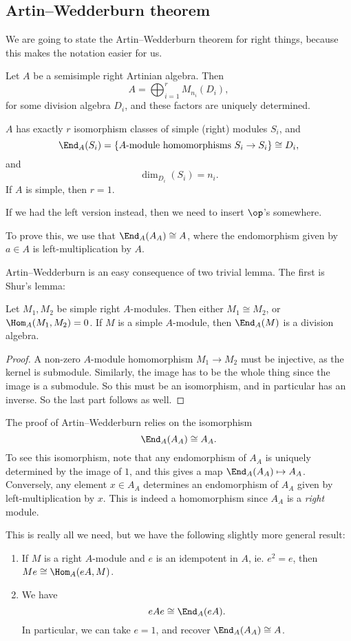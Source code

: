 \documentclass[a4paper]{article}
\begin{document}
\subsection{Artin--Wedderburn theorem}
We are going to state the Artin--Wedderburn theorem for right things, because this makes the notation easier for us.
\begin{thm}
  Let $A$ be a semisimple right Artinian algebra. Then
  \[
    A = \bigoplus_{i = 1}^r M_{n_i}(D_i),
  \]
  for some division algebra $D_i$, and these factors are uniquely determined.
  
  $A$ has exactly $r$ isomorphism classes of simple (right) modules $S_i$, and
  \[
    \End_A (S_i) = \{\text{$A$-module homomorphisms $S_i \to S_i$}\} \cong D_i,
  \]
  and
  \[
    \dim_{D_i}(S_i) = n_i.
  \]
  If $A$ is simple, then $r = 1$.
\end{thm}
If we had the left version instead, then we need to insert $\op$'s somewhere.

To prove this, we use that $\End_A(A_A) \cong A$, where the endomorphism given by $a \in A$ is left-multiplication by $A$.

Artin--Wedderburn is an easy consequence of two trivial lemma. The first is Shur's lemma:
\begin{lemma}
  Let $M_1, M_2$ be simple right $A$-modules. Then either $M_1 \cong M_2$, or $\Hom_A(M_1, M_2) = 0$. If $M$ is a simple $A$-module, then $\End_A(M)$ is a division algebra.
\end{lemma}

\begin{proof}
  A non-zero $A$-module homomorphism $M_1 \to M_2$ must be injective, as the kernel is submodule. Similarly, the image has to be the whole thing since the image is a submodule. So this must be an isomorphism, and in particular has an inverse. So the last part follows as well.
\end{proof}

The proof of Artin--Wedderburn relies on the isomorphism
\[
  \End_A(A_A) \cong A_A.
\]
To see this isomorphism, note that any endomorphism of $A_A$ is uniquely determined by the image of $1$, and this gives a map $\End_A(A_A) \mapsto A_A$. Conversely, any element $x \in A_A$ determines an endomorphism of $A_A$ given by left-multiplication by $x$. This is indeed a homomorphism since $A_A$ is a \emph{right} module.

This is really all we need, but we have the following slightly more general result:
\begin{lemma}\leavevmode
  \begin{enumerate}
    \item If $M$ is a right $A$-module and $e$ is an idempotent in $A$, ie. $e^2 = e$, then $Me \cong \Hom_A(eA, M)$.
    \item We have
      \[
        eAe \cong \End_A(eA).
      \]
      In particular, we can take $e = 1$, and recover $\End_A(A_A) \cong A$.
  \end{enumerate}
\end{lemma}
\end{document}
